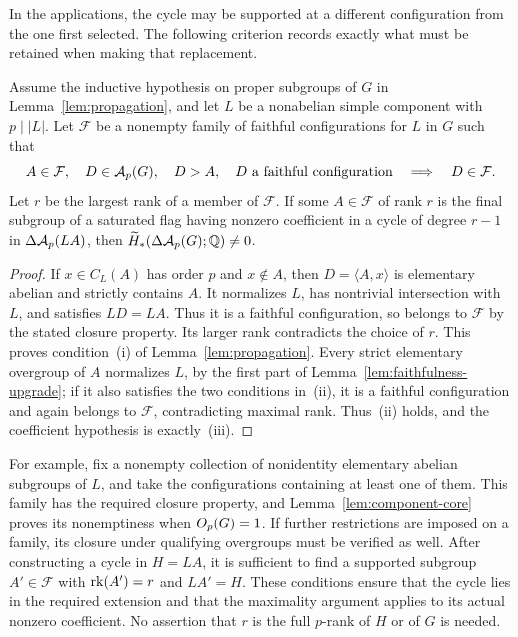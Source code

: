 In the applications, the cycle may be supported at a different
configuration from the one first selected.  The following criterion
records exactly what must be retained when making that replacement.

\begin{corollary}\label{cor:maximal-family}
Assume the inductive hypothesis on proper subgroups of $G$ in
Lemma~\ref{lem:propagation}, and let $L$ be a nonabelian simple
component with $p\mid|L|$.  Let $\mathcal F$ be a nonempty family
of faithful configurations for $L$ in $G$ such that
\[
 A\in\mathcal F,\quad D\in\mathcal A_p(G),\quad D>A,
 \quad D\text{ a faithful configuration}
 \quad\Longrightarrow\quad D\in\mathcal F.
\]
Let $r$ be the largest rank of a member of $\mathcal F$.
If some $A\in\mathcal F$ of rank $r$ is the final subgroup of a
saturated flag having nonzero coefficient in a cycle of degree $r-1$
in $\Delta\mathcal A_p(LA)$, then
$\widetilde H_*(\Delta\mathcal A_p(G);\mathbb Q)\ne0$.
\end{corollary}

\begin{proof}
If $x\in C_L(A)$ has order $p$ and $x\notin A$, then
$D=\langle A,x\rangle$ is elementary abelian and strictly contains
$A$.  It normalizes $L$, has nontrivial intersection with $L$, and
satisfies $LD=LA$.  Thus it is a faithful configuration, so belongs
to $\mathcal F$ by the stated closure property.  Its larger rank
contradicts the choice of $r$.  This proves condition~\textup{(i)}
of Lemma~\ref{lem:propagation}.  Every strict elementary overgroup
of $A$ normalizes $L$, by the first part of
Lemma~\ref{lem:faithfulness-upgrade}; if it also satisfies the two
conditions in~\textup{(ii)}, it is a faithful configuration and
again belongs to $\mathcal F$, contradicting maximal rank.
Thus~\textup{(ii)} holds, and the coefficient hypothesis is
exactly~\textup{(iii)}.
\end{proof}

For example, fix a nonempty collection of nonidentity elementary
abelian subgroups of $L$, and take the configurations containing at
least one of them.  This family has the required closure property,
and Lemma~\ref{lem:component-core} proves its nonemptiness when
$O_p(G)=1$.  If further restrictions are imposed on a family, its
closure under qualifying overgroups must be verified as well.
After constructing a cycle in $H=LA$, it is sufficient to find a
supported subgroup $A'\in\mathcal F$ with $\operatorname{rk}(A')=r$ and
$LA'=H$.  These conditions ensure that the cycle lies in the
required extension and that the maximality argument applies to its
actual nonzero coefficient.  No assertion that $r$ is the full
$p$-rank of $H$ or of $G$ is needed.
